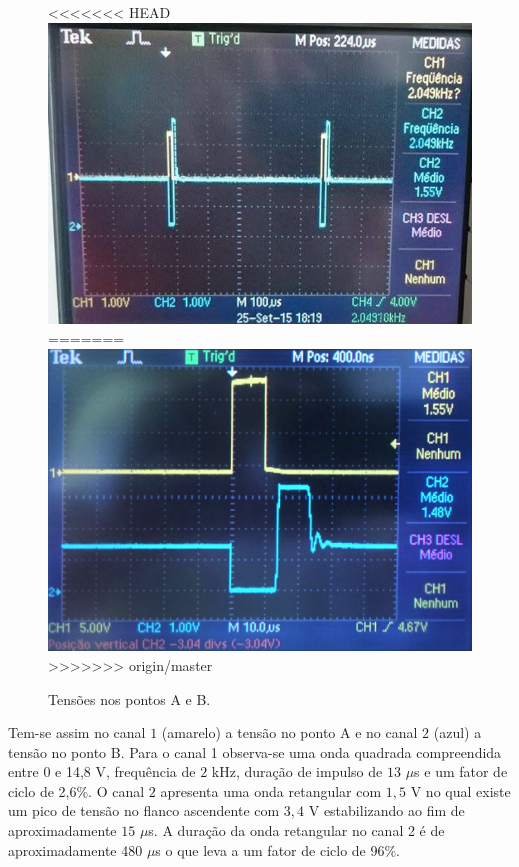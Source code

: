 \documentclass[a4paper,11pt]{article}
\numberwithin{equation}{section}
\begin{document}
\begin{figure}[h]
	\centering
<<<<<<< HEAD
	\includegraphics[keepaspectratio=true, scale=0.8]{img/fig4}
=======
	\includegraphics[keepaspectratio=true, scale=0.14]{img/DSC0116}
>>>>>>> origin/master
	\caption{Tensões nos pontos A e B.}
	\label{fig:photo 1}
	\vspace{-0.8em}
\end{figure}

Tem-se assim no canal $1$ (amarelo) a tensão no ponto A e no canal $2$ (azul) a tensão no ponto B. Para o canal 1 observa-se uma onda quadrada compreendida entre 0 e 14,8 V, frequência de $2$ kHz, duração de impulso de $13$ $\mu$s e um fator de ciclo de 2,6\%. O canal $2$ apresenta uma onda retangular com $1,5$ V no qual existe um pico de tensão no flanco ascendente com $3,4$ V estabilizando ao fim de aproximadamente $15$ $\mu$s. A duração da onda retangular no canal 2 é de aproximadamente 480 $\mu$s o que leva a um fator de ciclo de 96\%. 
\end{document}
